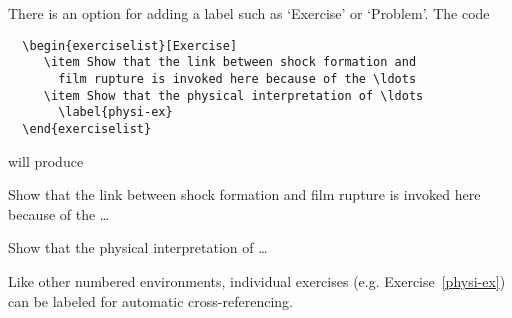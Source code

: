 There is an option for adding a label such as `Exercise' or `Problem'. The code
\begin{verbatim}
  \begin{exerciselist}[Exercise]
     \item Show that the link between shock formation and
       film rupture is invoked here because of the \ldots
     \item Show that the physical interpretation of \ldots
       \label{physi-ex}
  \end{exerciselist}
\end{verbatim}
will produce
  \begin{exerciselist}[Exercise]
     \item Show that the link between shock formation and
       film rupture is invoked here because of the \ldots
     \item Show that the physical interpretation of \ldots
       \label{physi-ex}
  \end{exerciselist}
Like other numbered environments, individual exercises
(e.g. Exercise~\ref{physi-ex}) can be labeled for automatic cross-referencing.

